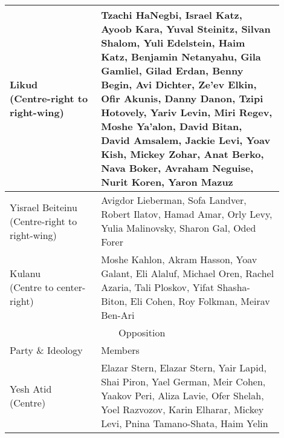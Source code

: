 \begin{table}
\begin{tabular}{|p{0.3\linewidth}|p{0.6\linewidth}|}
\hline
\makecell{Likud \\ (Centre-right to right-wing)}  & Tzachi HaNegbi, Israel Katz, Ayoob Kara, Yuval Steinitz, Silvan Shalom, Yuli Edelstein, Haim Katz, Benjamin Netanyahu, Gila Gamliel, Gilad Erdan, Benny Begin, Avi Dichter, Ze'ev Elkin, Ofir Akunis, Danny Danon, Tzipi Hotovely, Yariv Levin, Miri Regev, Moshe Ya'alon, David Bitan, David Amsalem, Jackie Levi, Yoav Kish, Mickey Zohar, Anat Berko, Nava Boker, Avraham Neguise, Nurit Koren, Yaron Mazuz \\
\hline
\makecell{Yisrael Beiteinu \\ (Centre-right to right-wing)}  & Avigdor Lieberman, Sofa Landver, Robert Ilatov, Hamad Amar, Orly Levy, Yulia Malinovsky, Sharon Gal, Oded Forer                                                                                                                                                                                                                                                                                                                                             \\
\hline
\makecell{Kulanu \\ (Centre to center-right)}  & Moshe Kahlon, Akram Hasson, Yoav Galant, Eli Alaluf, Michael Oren, Rachel Azaria, Tali Ploskov, Yifat Shasha-Biton, Eli Cohen, Roy Folkman, Meirav Ben-Ari                                                                                                                                                                                                                                                                                                  \\
\hline
\hline
\multicolumn{2}{|c|}{ Opposition }                                                                                                                                                                                                                                                                                                                                                                                                                                                \\
\hline
Party \& Ideology          & Members \\
\hline
\makecell{Yesh Atid \\ (Centre)}  & Elazar Stern, Elazar Stern, Yair Lapid, Shai Piron, Yael German, Meir Cohen, Yaakov Peri, Aliza Lavie, Ofer Shelah, Yoel Razvozov, Karin Elharar, Mickey Levi, Pnina Tamano-Shata, Haim Yelin                                                                                                                                                                                                                                                               \\

\end{tabular}
\end{table}
